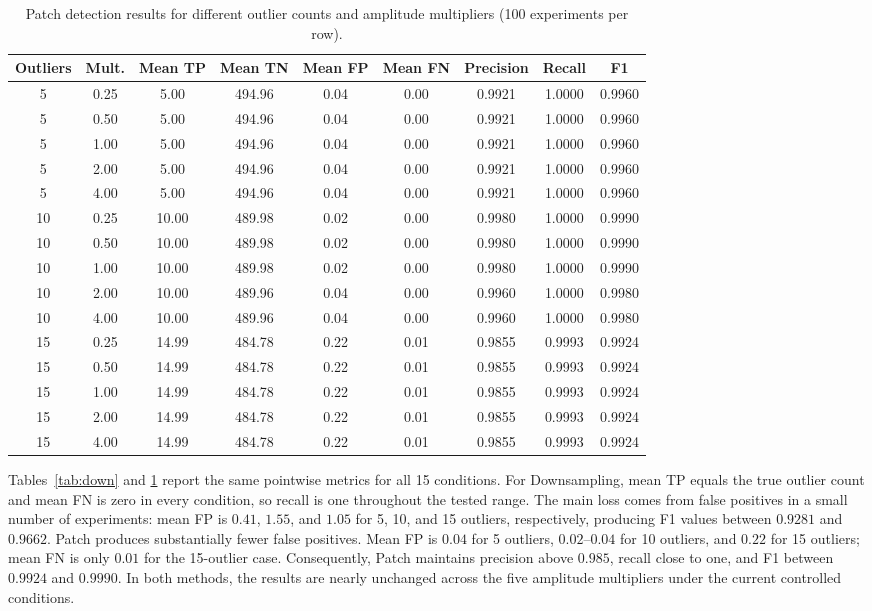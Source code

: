\documentclass[journal]{IEEEtran}
\begin{document}
\begin{table}[t]
\centering
\caption{Patch detection results for different outlier counts and amplitude multipliers (100 experiments per row).}
\label{tab:patch}
\scriptsize
\setlength{\tabcolsep}{4.0pt}
\begin{tabular}{ccccccccc}
\toprule
Outliers & Mult. & Mean TP & Mean TN & Mean FP & Mean FN & Precision & Recall & F1\\
\midrule
5&0.25&5.00&494.96&0.04&0.00&0.9921&1.0000&0.9960\\
5&0.50&5.00&494.96&0.04&0.00&0.9921&1.0000&0.9960\\
5&1.00&5.00&494.96&0.04&0.00&0.9921&1.0000&0.9960\\
5&2.00&5.00&494.96&0.04&0.00&0.9921&1.0000&0.9960\\
5&4.00&5.00&494.96&0.04&0.00&0.9921&1.0000&0.9960\\
10&0.25&10.00&489.98&0.02&0.00&0.9980&1.0000&0.9990\\
10&0.50&10.00&489.98&0.02&0.00&0.9980&1.0000&0.9990\\
10&1.00&10.00&489.98&0.02&0.00&0.9980&1.0000&0.9990\\
10&2.00&10.00&489.96&0.04&0.00&0.9960&1.0000&0.9980\\
10&4.00&10.00&489.96&0.04&0.00&0.9960&1.0000&0.9980\\
15&0.25&14.99&484.78&0.22&0.01&0.9855&0.9993&0.9924\\
15&0.50&14.99&484.78&0.22&0.01&0.9855&0.9993&0.9924\\
15&1.00&14.99&484.78&0.22&0.01&0.9855&0.9993&0.9924\\
15&2.00&14.99&484.78&0.22&0.01&0.9855&0.9993&0.9924\\
15&4.00&14.99&484.78&0.22&0.01&0.9855&0.9993&0.9924\\
\bottomrule
\end{tabular}
\end{table}

Tables~\ref{tab:down} and \ref{tab:patch} report the same pointwise metrics for all 15 conditions. For Downsampling, mean TP equals the true outlier count and mean FN is zero in every condition, so recall is one throughout the tested range. The main loss comes from false positives in a small number of experiments: mean FP is $0.41$, $1.55$, and $1.05$ for 5, 10, and 15 outliers, respectively, producing F1 values between $0.9281$ and $0.9662$. Patch produces substantially fewer false positives. Mean FP is $0.04$ for 5 outliers, $0.02$--$0.04$ for 10 outliers, and $0.22$ for 15 outliers; mean FN is only $0.01$ for the 15-outlier case. Consequently, Patch maintains precision above $0.985$, recall close to one, and F1 between $0.9924$ and $0.9990$. In both methods, the results are nearly unchanged across the five amplitude multipliers under the current controlled conditions.
\end{document}
